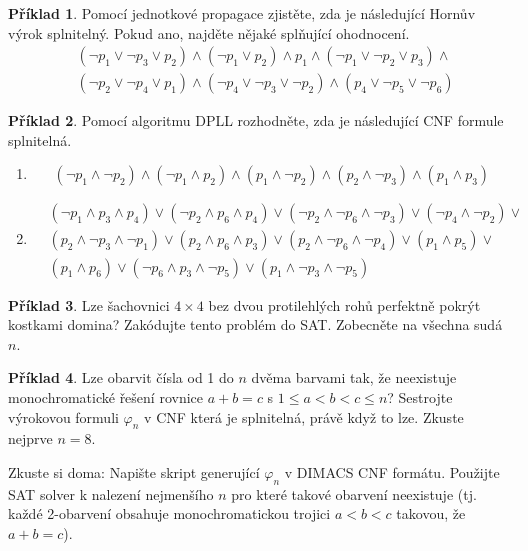 \documentclass[a4paper]{article}
\theoremstyle{definition}
\newtheorem{problem}{Příklad}
\begin{document}
\medskip\begin{problem}
Pomocí jednotkové propagace zjistěte, zda je následující Hornův výrok splnitelný. Pokud ano, najděte nějaké splňující ohodnocení.
\begin{align*}
    &(\neg p_1 \vee \neg p_3 \vee p_2)\wedge(\neg p_1 \vee p_2)\wedge p_1 \wedge (\neg p_1 \vee \neg p_2 \vee p_3)\wedge \\
    &(\neg p_2 \vee \neg p_4 \vee p_1)\wedge(\neg p_4 \vee \neg p_3 \vee \neg p_2)\wedge(p_4\vee \neg p_5 \vee\neg p_6)
\end{align*}
\end{problem}
    

\medskip\begin{problem}
    Pomocí algoritmu DPLL rozhodněte, zda je následující CNF formule splnitelná.
    \begin{enumerate}
        \item $$ (\neg p_1 \wedge \neg p_2)\land( \neg p_1 \wedge p_2)\land( p_1 \wedge \neg p_2)\land( p_2 \wedge \neg p_3)\land( p_1 \wedge p_3)$$
        \item \begin{align*}
            &(\neg p_1 \wedge p_3 \wedge p_4)\vee( \neg p_2 \wedge p_6 \wedge p_4)\vee( \neg p_2 \wedge \neg p_6 \wedge \neg p_3)\vee(
                \neg p_4 \wedge \neg p_2)\vee \\ & ( p_2 \wedge \neg p_3 \wedge \neg p_1)\vee ( p_2 \wedge p_6 \wedge p_3)\vee
                ( p_2 \wedge \neg p_6 \wedge \neg p_4)\vee
                ( p_1 \wedge p_5)\vee \\ & ( p_1 \wedge p_6)\vee(
                \neg p_6 \wedge p_3 \wedge \neg p_5)\vee( p_1 \wedge \neg p_3 \wedge \neg p_5)    
        \end{align*}
    \end{enumerate}
\end{problem}


\medskip\begin{problem}
Lze šachovnici $4\times 4$ bez dvou protilehlých rohů perfektně pokrýt kostkami domina? Zakódujte tento problém do SAT. Zobecněte na všechna sudá~$n$.
\end{problem}
    
    
\medskip\begin{problem}
    Lze obarvit čísla od 1 do $n$ dvěma barvami tak, že neexistuje monochromatické řešení rovnice
    $a+b=c$ s $1\leq a<b<c\leq n$? Sestrojte výrokovou formuli $\varphi_n$ v CNF která je splnitelná, právě když to lze. Zkuste nejprve $n=8$.
    
    Zkuste si doma: Napište skript generující $\varphi_n$ v DIMACS CNF formátu. Použijte SAT solver k nalezení nejmenšího $n$ pro které takové obarvení neexistuje (tj. každé 2-obarvení obsahuje monochromatickou trojici $a<b<c$ takovou, že $a+b=c$).
\end{problem}
\end{document}
